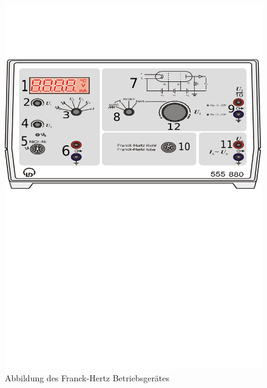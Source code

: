 \documentclass[12pt,a4paper]{article}
\begin{document}
\begin{figure}[H] 
  \centering
    \includegraphics[trim = 0mm 145mm 0mm 40mm, clip, scale = 0.7]{aufbau.pdf}
  	\caption[Abbildung des Franck-Hertz Betriebsgerätes]{Abbildung des Franck-Hertz Betriebsgerätes\footnotemark}
  \label{fig:abb_versuch_3}
\end{figure}
\end{document}

